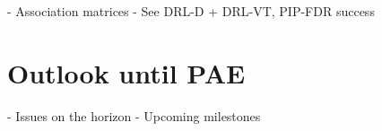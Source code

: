 \documentclass[a4paper]{spie}  %
\begin{document}
- Association matrices
- See DRL-D + DRL-VT, PIP-FDR success




\section{Outlook until PAE}
\label{sec:outlook}
- Issues on the horizon
- Upcoming milestones


\appendix    %

\acknowledgments %


\end{document}
